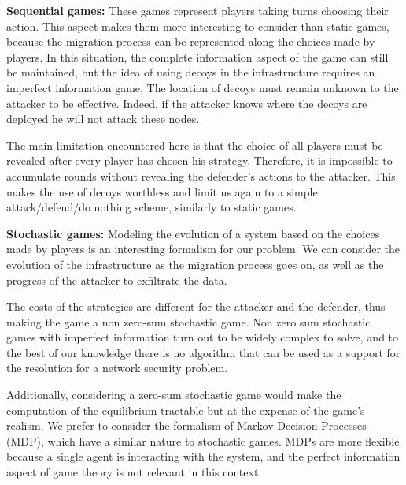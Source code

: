 \textbf{Sequential games: } These games represent players taking turns choosing their action. This aspect makes them more interesting to consider than static games, because the migration process can be represented along the choices made by players. In this situation, the complete information aspect of the game can still be maintained, but the idea of using decoys in the infrastructure requires an imperfect information game. The location of decoys must remain unknown to the attacker to be effective.
Indeed, if the attacker knows where the decoys are deployed he will not attack these nodes.

The main limitation encountered here is that the choice of all players must be revealed after every player has chosen his strategy. Therefore, it is impossible to accumulate rounds without revealing the defender's actions to the attacker. This makes the use of decoys worthless and limit us again to a simple attack/defend/do nothing scheme, similarly to static games.

\textbf{Stochastic games:} Modeling the evolution of a system based on the choices made by players is an interesting formalism for our problem. We can consider the evolution of the infrastructure as the migration process goes on, as well as the progress of the attacker to exfiltrate the data. 

The costs of the strategies are different for the attacker and the defender, thus making the game a non zero-sum stochastic game. Non zero sum stochastic games with imperfect information turn out to be widely complex to solve, and to the best of our knowledge there is no algorithm that can be used as a support for the resolution for a network security problem. 

Additionally, considering a zero-sum stochastic game would make the computation of the equilibrium tractable but at the expense of the game's realism.
We prefer to consider the formalism of Markov Decision Processes (MDP), which have a similar nature to stochastic games. MDPs are more flexible because a single agent is interacting with the system, and the perfect information aspect of game theory is not relevant in this context. 


